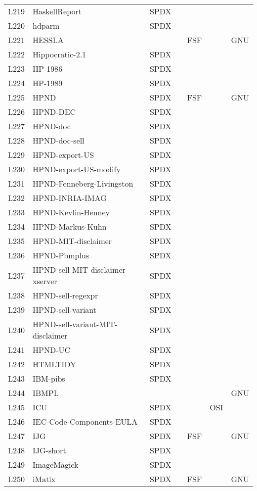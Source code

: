 \begin{longtable}[h]{m{2cm} | m{7cm} | c | c | c | c | c}
L219 & HaskellReport & SPDX &  &  &  &  \\
L220 & hdparm & SPDX &  &  &  &  \\
L221 & HESSLA &  &  & FSF &  & GNU \\
L222 & Hippocratic-2.1 & SPDX &  &  &  &  \\
L223 & HP-1986 & SPDX &  &  &  &  \\
L224 & HP-1989 & SPDX &  &  &  &  \\
L225 & HPND & SPDX &  & FSF &  & GNU \\
L226 & HPND-DEC & SPDX &  &  &  &  \\
L227 & HPND-doc & SPDX &  &  &  &  \\
L228 & HPND-doc-sell & SPDX &  &  &  &  \\
L229 & HPND-export-US & SPDX &  &  &  &  \\
L230 & HPND-export-US-modify & SPDX &  &  &  &  \\
L231 & HPND-Fenneberg-Livingston & SPDX &  &  &  &  \\
L232 & HPND-INRIA-IMAG & SPDX &  &  &  &  \\
L233 & HPND-Kevlin-Henney & SPDX &  &  &  &  \\
L234 & HPND-Markus-Kuhn & SPDX &  &  &  &  \\
L235 & HPND-MIT-disclaimer & SPDX &  &  &  &  \\
L236 & HPND-Pbmplus & SPDX &  &  &  &  \\
L237 & HPND-sell-MIT-disclaimer-xserver & SPDX &  &  &  &  \\
L238 & HPND-sell-regexpr & SPDX &  &  &  &  \\
L239 & HPND-sell-variant & SPDX &  &  &  &  \\
L240 & HPND-sell-variant-MIT-disclaimer & SPDX &  &  &  &  \\
L241 & HPND-UC & SPDX &  &  &  &  \\
L242 & HTMLTIDY & SPDX &  &  &  &  \\
L243 & IBM-pibs & SPDX &  &  &  &  \\
L244 & IBMPL &  &  &  &  & GNU \\
L245 & ICU & SPDX &  &  & OSI &  \\
L246 & IEC-Code-Components-EULA & SPDX &  &  &  &  \\
L247 & IJG & SPDX &  & FSF &  & GNU \\
L248 & IJG-short & SPDX &  &  &  &  \\
L249 & ImageMagick & SPDX &  &  &  &  \\
L250 & iMatix & SPDX &  & FSF &  & GNU \\

\end{longtable}
